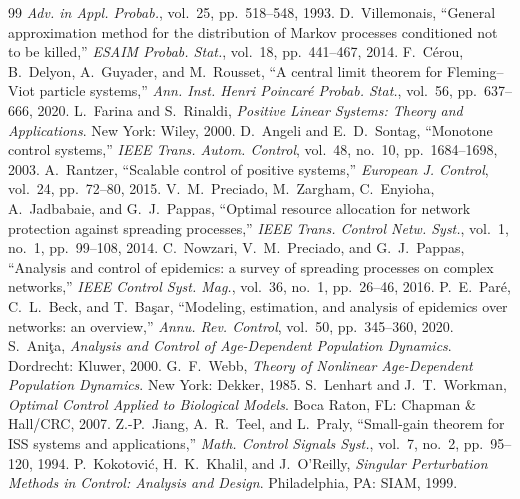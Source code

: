 \documentclass[letterpaper, 10pt, conference]{ieeeconf}
\begin{document}
\begin{thebibliography}{99}
\emph{Adv. in Appl. Probab.}, vol.~25, pp.~518--548, 1993.
 D.~Villemonais, ``General approximation method for the
distribution of Markov processes conditioned not to be killed,'' \emph{ESAIM
Probab. Stat.}, vol.~18, pp.~441--467, 2014.
 F.~C\'erou, B.~Delyon, A.~Guyader, and M.~Rousset, ``A central
limit theorem for Fleming--Viot particle systems,'' \emph{Ann. Inst. Henri
Poincar\'e Probab. Stat.}, vol.~56, pp.~637--666, 2020.
 L.~Farina and S.~Rinaldi, \emph{Positive Linear Systems: Theory
and Applications}. New York: Wiley, 2000.
 D.~Angeli and E.~D.~Sontag, ``Monotone control systems,''
\emph{IEEE Trans. Autom. Control}, vol.~48, no.~10, pp.~1684--1698, 2003.
 A.~Rantzer, ``Scalable control of positive systems,''
\emph{European J. Control}, vol.~24, pp.~72--80, 2015.
 V.~M.~Preciado, M.~Zargham, C.~Enyioha, A.~Jadbabaie, and
G.~J.~Pappas, ``Optimal resource allocation for network protection against
spreading processes,'' \emph{IEEE Trans. Control Netw. Syst.}, vol.~1, no.~1,
pp.~99--108, 2014.
 C.~Nowzari, V.~M.~Preciado, and G.~J.~Pappas, ``Analysis and
control of epidemics: a survey of spreading processes on complex networks,''
\emph{IEEE Control Syst. Mag.}, vol.~36, no.~1, pp.~26--46, 2016.
 P.~E.~Par\'e, C.~L.~Beck, and T.~Ba\c{s}ar, ``Modeling,
estimation, and analysis of epidemics over networks: an overview,''
\emph{Annu. Rev. Control}, vol.~50, pp.~345--360, 2020.
 S.~Ani\c{t}a, \emph{Analysis and Control of Age-Dependent
Population Dynamics}. Dordrecht: Kluwer, 2000.
 G.~F.~Webb, \emph{Theory of Nonlinear Age-Dependent Population
Dynamics}. New York: Dekker, 1985.
 S.~Lenhart and J.~T.~Workman, \emph{Optimal Control Applied to
Biological Models}. Boca Raton, FL: Chapman \& Hall/CRC, 2007.
 Z.-P.~Jiang, A.~R.~Teel, and L.~Praly, ``Small-gain theorem
for ISS systems and applications,'' \emph{Math. Control Signals Syst.}, vol.~7,
no.~2, pp.~95--120, 1994.
 P.~Kokotovi\'c, H.~K.~Khalil, and J.~O'Reilly,
\emph{Singular Perturbation Methods in Control: Analysis and Design}.
Philadelphia, PA: SIAM, 1999.
\end{thebibliography}
\end{document}
